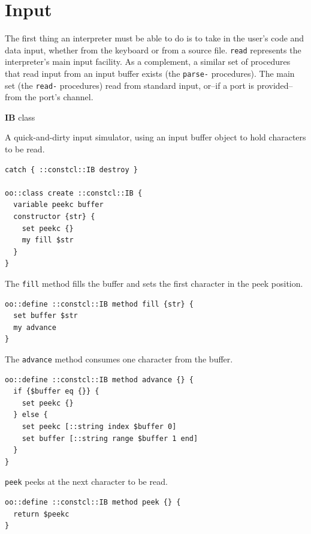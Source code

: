 \documentclass[twoside,9pt]{report}
\begin{document}
\chapter{Input}
\label{input}

The first thing an interpreter must be able to do is to take in the user's code and data input, whether from the keyboard or from a source file. \texttt{read} represents the interpreter's main input facility. As a complement, a similar set of procedures that read input from an input buffer exists (the \texttt{parse-} procedures). The main set (the \texttt{read-} procedures) read from standard input, or--if a port is provided--from the port's channel.


\textbf{IB} class


A quick-and-dirty input simulator, using an input buffer object to hold characters to be read.

\noindent\makebox[\linewidth]{\rule{\linewidth}{0.4pt}}
\begin{lstlisting}
catch { ::constcl::IB destroy }
 
oo::class create ::constcl::IB {
  variable peekc buffer
  constructor {str} {
    set peekc {}
    my fill $str
  }
}
\end{lstlisting}
\noindent\makebox[\linewidth]{\rule{\linewidth}{0.4pt}}

The \texttt{fill} method fills the buffer and sets the first character in the peek position.

\noindent\makebox[\linewidth]{\rule{\linewidth}{0.4pt}}
\begin{lstlisting}
oo::define ::constcl::IB method fill {str} {
  set buffer $str
  my advance
}
\end{lstlisting}
\noindent\makebox[\linewidth]{\rule{\linewidth}{0.4pt}}

The \texttt{advance} method consumes one character from the buffer.

\noindent\makebox[\linewidth]{\rule{\linewidth}{0.4pt}}
\begin{lstlisting}
oo::define ::constcl::IB method advance {} {
  if {$buffer eq {}} {
    set peekc {}
  } else {
    set peekc [::string index $buffer 0]
    set buffer [::string range $buffer 1 end]
  }
}
\end{lstlisting}
\noindent\makebox[\linewidth]{\rule{\linewidth}{0.4pt}}

\texttt{peek} peeks at the next character to be read.

\noindent\makebox[\linewidth]{\rule{\linewidth}{0.4pt}}
\begin{lstlisting}
oo::define ::constcl::IB method peek {} {
  return $peekc
}
\end{lstlisting}
\noindent\makebox[\linewidth]{\rule{\linewidth}{0.4pt}}
\end{document}
